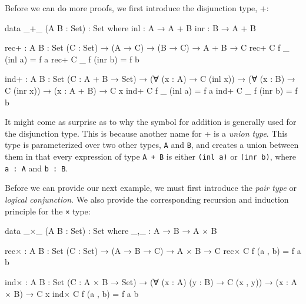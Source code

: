 \documentclass[12pt]{article}
\begin{document}
Before we can do more proofs, we first introduce the disjunction type, +: 
\begin{center}
\begin{minipage}{0.9\textwidth}
\begin{code}
data _+_ (A B : Set) : Set where
  inl : A → A + B
  inr : B → A + B

rec+ : {A B : Set} (C : Set) → (A → C) → (B → C) →
       A + B → C
rec+ C f _ (inl a) = f a
rec+ C _ f (inr b) = f b

ind+ : {A B : Set} (C : A + B → Set) →
       (∀ (x : A) → C (inl x)) →
       (∀ (x : B) → C (inr x)) →
       (x : A + B) → C x
ind+ C f _ (inl a) = f a
ind+ C _ f (inr b) = f b
\end{code}
\end{minipage}
\end{center}
It might come as surprise as to why the symbol for addition is generally used
for the disjunction type. This is because another name for + is a {\it union type}.
This type is parameterized over two other types, {\tt A} and {\tt B}, and
creates a union between them in that every expression of type {\tt A + B} is
either {\tt (inl a)} or {\tt (inr b)}, where {\tt a : A} and {\tt b : B}.

Before we can provide our next example, we must first introduce the
{\em pair type} or {\em logical conjunction}. We also provide the corresponding
recursion and induction principle for the {\tt ×} type:
\begin{center}
\begin{minipage}{0.9\textwidth}
\begin{code}
data _×_ (A B : Set) : Set where
  _,_ : A → B → A × B

rec× : {A B : Set} (C : Set) → (A → B → C) → A × B → C
rec× C f (a , b) = f a b

ind× : {A B : Set} (C : A × B → Set) →
       (∀ (x : A) (y : B) → C (x , y)) →
       (x : A × B) → C x
ind× C f (a , b) = f a b
\end{code}
\end{minipage}
\end{center}
\end{document}
